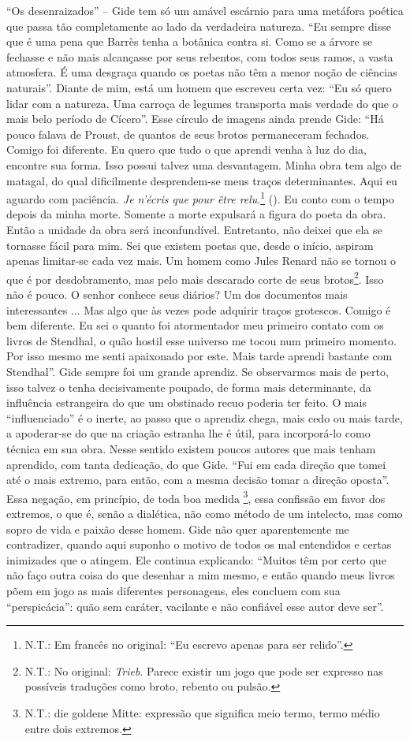 ``Os desenraizados'' -- Gide tem só um amável escárnio para uma metáfora
poética que passa tão completamente ao lado da verdadeira natureza. ``Eu
sempre disse que é uma pena que Barrès tenha a botânica contra si. Como
se a árvore se fechasse e não mais alcançasse por seus rebentos, com
todos seus ramos, a vasta atmosfera. É uma desgraça quando os poetas não
têm a menor noção de ciências naturais''. Diante de mim, está um homem
que escreveu certa vez: ``Eu só quero lidar com a natureza. Uma carroça
de legumes transporta mais verdade do que o mais belo período de
Cícero''. Esse círculo de imagens ainda prende Gide: ``Há pouco falava
de Proust, de quantos de seus brotos permaneceram fechados. Comigo foi
diferente. Eu quero que tudo o que aprendi venha à luz do dia, encontre
sua forma. Isso possui talvez uma desvantagem. Minha obra tem algo de
matagal, do qual dificilmente desprendem-se meus traços determinantes.
Aqui eu aguardo com paciência. \emph{Je n'écris que pour être
relu}.\footnote{N.T.: Em francês no original: ``Eu escrevo apenas para
  ser relido''.} (). Eu conto com o tempo depois da minha morte. Somente
a morte expulsará a figura do poeta da obra. Então a unidade da obra
será inconfundível. Entretanto, não deixei que ela se tornasse fácil
para mim. Sei que existem poetas que, desde o início, aspiram apenas
limitar-se cada vez mais. Um homem como Jules Renard não se tornou o que
é por desdobramento, mas pelo mais descarado corte de seus
brotos\footnote{N.T.: No original: \emph{Trieb}. Parece existir um jogo
  que pode ser expresso nas possíveis traduções como broto, rebento ou
  pulsão.}. Isso não é pouco. O senhor conhece seus diários? Um dos
documentos mais interessantes ... Mas algo que às vezes pode adquirir
traços grotescos. Comigo é bem diferente. Eu sei o quanto foi
atormentador meu primeiro contato com os livros de Stendhal, o quão
hostil esse universo me tocou num primeiro momento. Por isso mesmo me
senti apaixonado por este. Mais tarde aprendi bastante com Stendhal''.
Gide sempre foi um grande aprendiz. Se observarmos mais de perto, isso
talvez o tenha decisivamente poupado, de forma mais determinante, da
influência estrangeira do que um obstinado recuo poderia ter feito. O
mais ``influenciado'' é o inerte, ao passo que o aprendiz chega, mais
cedo ou mais tarde, a apoderar-se do que na criação estranha lhe é útil,
para incorporá-lo como técnica em sua obra. Nesse sentido existem poucos
autores que mais tenham aprendido, com tanta dedicação, do que Gide.
``Fui em cada direção que tomei até o mais extremo, para então, com a
mesma decisão tomar a direção oposta''. Essa negação, em princípio, de
toda boa medida \footnote{N.T.: die goldene Mitte: expressão que
  significa meio termo, termo médio entre dois extremos.}, essa
confissão em favor dos extremos, o que é, senão a dialética, não como
método de um intelecto, mas como sopro de vida e paixão desse homem.
Gide não quer aparentemente me contradizer, quando aqui suponho o motivo
de todos os mal entendidos e certas inimizades que o atingem. Ele
continua explicando: ``Muitos têm por certo que não faço outra coisa do
que desenhar a mim mesmo, e então quando meus livros põem em jogo as
mais diferentes personagens, eles concluem com sua ``perspicácia'': quão
sem caráter, vacilante e não confiável esse autor deve ser''.

